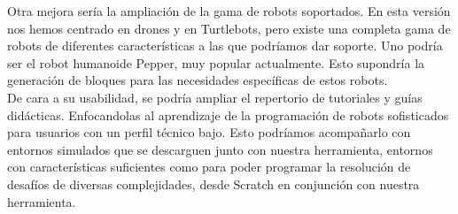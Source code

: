 Otra mejora sería la ampliación de la gama de robots soportados. En esta versión nos hemos centrado en drones y en Turtlebots, pero existe una completa gama de robots de diferentes características a las que podríamos dar soporte. Uno podría ser el robot humanoide Pepper, muy popular actualmente. Esto supondría la generación de bloques para las necesidades específicas de estos robots.\\

De cara a su usabilidad, se podría ampliar el repertorio de tutoriales y guías didácticas. Enfocandolas al aprendizaje de la programación de robots sofisticados para usuarios con un perfil técnico bajo. Esto podríamos acompañarlo con entornos simulados que se descarguen junto con nuestra herramienta, entornos con características suficientes como para poder programar la resolución de desafíos de diversas complejidades, desde Scratch en conjunción con nuestra herramienta.\\